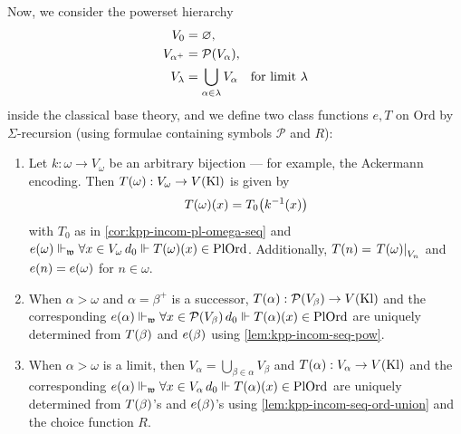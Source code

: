 \documentclass[12pt,openany]{book}
\theoremstyle{plain}
\theoremstyle{definition}
\newcommand\opA[1]{\mathop{\forall #1}}
\newcommand\Pow{\mathcal{P}}
\newcommand\Ord{\mathrm{Ord}}
\newcommand\PlOrd{\mathrm{PlOrd}}
\newcommand\Kl{\mathrm{Kl}}
\begin{document}
Now, we consider the powerset hierarchy
\begin{align*}
  V_0          & = \varnothing,                                                           \\
  V_{\alpha^+} & = \Pow\mleft(V_\alpha\mright),                                           \\
  V_\lambda    & = \bigcup_{\alpha \in \lambda} V_\alpha \quad \text{for limit $\lambda$}
\end{align*}
inside the classical base theory, and we define two class functions $e, T$ on $\Ord$ by $\Sigma$-recursion (using formulae containing symbols $\Pow$ and $R$):
\begin{enumerate}[label=(\arabic*)]
  \item Let $k : \omega \rightarrow V_\omega$ be an arbitrary bijection --- for example, the Ackermann encoding. Then $T\mleft(\omega\mright) : V_\omega \rightarrow V\mleft(\Kl\mright)$ is given by
        \[T\mleft(\omega\mright)\mleft(x\mright) = T_0\mleft(k^{-1}\mleft(x\mright)\mright)\]
        with $T_0$ as in \autoref{cor:kpp-incom-pl-omega-seq} and $e\mleft(\omega\mright) \Vdash_\mathfrak{w} \opA{x \in V_\omega} d_0 \Vdash T\mleft(\omega\mright)\mleft(x\mright) \in \PlOrd$. Additionally, $T\mleft(n\mright) = \left.T\mleft(\omega\mright)\right|_{V_n}$ and $e\mleft(n\mright) = e\mleft(\omega\mright)$ for $n \in \omega$.
  \item When $\alpha > \omega$ and $\alpha = \beta^+$ is a successor, $T\mleft(\alpha\mright) : \Pow\mleft(V_\beta\mright) \rightarrow V\mleft(\Kl\mright)$ and the corresponding $e\mleft(\alpha\mright) \Vdash_\mathfrak{w} \opA{x \in \Pow\mleft(V_\beta\mright)} d_0 \Vdash T\mleft(\alpha\mright)\mleft(x\mright) \in \PlOrd$ are uniquely determined from $T\mleft(\beta\mright)$ and $e\mleft(\beta\mright)$ using \autoref{lem:kpp-incom-seq-pow}.
  \item When $\alpha > \omega$ is a limit, then $V_\alpha = \bigcup_{\beta \in \alpha} V_\beta$ and $T\mleft(\alpha\mright) : V_\alpha \rightarrow V\mleft(\Kl\mright)$ and the corresponding $e\mleft(\alpha\mright) \Vdash_\mathfrak{w} \opA{x \in V_\alpha} d_0 \Vdash T\mleft(\alpha\mright)\mleft(x\mright) \in \PlOrd$ are uniquely determined from $T\mleft(\beta\mright)$'s and $e\mleft(\beta\mright)$'s using \autoref{lem:kpp-incom-seq-ord-union} and the choice function $R$.
\end{enumerate}
\end{document}
